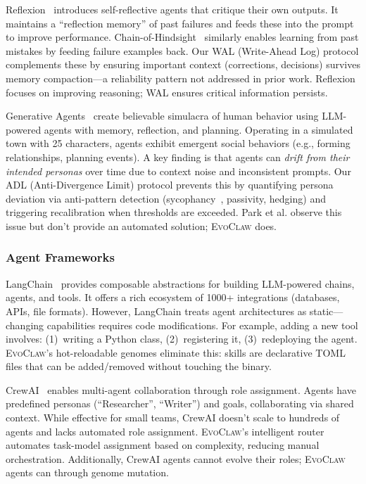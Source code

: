 \documentclass{article}
\newcommand{\evoclaw}{\textsc{EvoClaw}}
\begin{document}
Reflexion~\cite{shinn2024reflexion} introduces self-reflective agents that critique their own outputs. It maintains a ``reflection memory'' of past failures and feeds these into the prompt to improve performance. Chain-of-Hindsight~\cite{liu2023chain} similarly enables learning from past mistakes by feeding failure examples back. Our WAL (Write-Ahead Log) protocol complements these by ensuring important context (corrections, decisions) survives memory compaction---a reliability pattern not addressed in prior work. Reflexion focuses on improving reasoning; WAL ensures critical information persists.

Generative Agents~\cite{park2023generative} create believable simulacra of human behavior using LLM-powered agents with memory, reflection, and planning. Operating in a simulated town with 25 characters, agents exhibit emergent social behaviors (e.g., forming relationships, planning events). A key finding is that agents can \textit{drift from their intended personas} over time due to context noise and inconsistent prompts. Our ADL (Anti-Divergence Limit) protocol prevents this by quantifying persona deviation via anti-pattern detection (sycophancy~\cite{sharma2023sycophancy}, passivity, hedging) and triggering recalibration when thresholds are exceeded. Park et al. observe this issue but don't provide an automated solution; \evoclaw{} does.

\subsubsection{Agent Frameworks}

LangChain~\cite{langchain} provides composable abstractions for building LLM-powered chains, agents, and tools. It offers a rich ecosystem of 1000+ integrations (databases, APIs, file formats). However, LangChain treats agent architectures as static---changing capabilities requires code modifications. For example, adding a new tool involves: (1)~writing a Python class, (2)~registering it, (3)~redeploying the agent. \evoclaw{}'s hot-reloadable genomes eliminate this: skills are declarative TOML files that can be added/removed without touching the binary.

CrewAI~\cite{crewai} enables multi-agent collaboration through role assignment. Agents have predefined personas (``Researcher'', ``Writer'') and goals, collaborating via shared context. While effective for small teams, CrewAI doesn't scale to hundreds of agents and lacks automated role assignment. \evoclaw{}'s intelligent router automates task-model assignment based on complexity, reducing manual orchestration. Additionally, CrewAI agents cannot evolve their roles; \evoclaw{} agents can through genome mutation.
\end{document}
